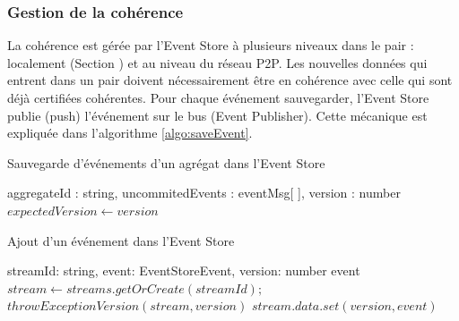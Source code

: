 \subsubsection{Gestion de la cohérence}
La cohérence est gérée par l'Event Store à plusieurs niveaux dans le pair :  
localement (Section 
) et au niveau du réseau \gls{P2P}.
 Les nouvelles données qui 
entrent dans un pair doivent nécessairement être en cohérence avec celle qui sont 
déjà certifiées cohérentes.
Pour chaque événement sauvegarder, l’Event Store publie (push) l’événement sur 
le bus (Event Publisher). Cette mécanique est expliquée dans l'algorithme 
\ref{algo:saveEvent}. 

\begin{algorithm} %
	\caption{Sauvegarde d'événements d'un agrégat dans l'Event Store} %
	\label{algo:saveEvent} %
	\begin{algorithmic} %
		\Require aggregateId : string, uncommitedEvents : eventMsg[ ], 
		version : number
		\State $expectedVersion \leftarrow version$
		\EndFor
	\end{algorithmic}
\end{algorithm}
\begin{algorithm} %
	\caption{Ajout d'un événement dans l'Event Store} %
	\label{algo:addevent} %
	\begin{algorithmic} %
		\Require streamId: string, event: EventStoreEvent, version: number
		\Ensure event
		\State $stream \leftarrow streams.getOrCreate(streamId);$
		\State $throwExceptionVersion(stream,version)$
		\EndIf
		\State $stream.data.set(version,event) $
	\end{algorithmic}
\end{algorithm}









